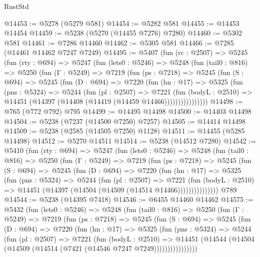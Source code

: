 \begin{lexlean}{RustStd}
\begin{coremodule}
@14453 := @5278 (@5279 @581)
@14454 := @5282 @581
@14455 := @14453 @14454
@14459 := @5238 (@5270 (@14455 @7276) @7280)
@14460 := @5302 @581
@14461 := @7286 @14460
@14462 := @5305 @581
@14466 := @7285 (@14461 @14462 @7247 @7249)
@14495 := @5407
    (fun (rc : @2507) =>
    @5245
      (fun (rty : @694) =>
      @5247
        (fun (lets0 : @5246) =>
        @5248
          (fun (tail0 : @816) =>
          @5250
            (fun (Γ : @5249) =>
            @7219
              (fun (ps : @7218) =>
              @5245
                (fun (S : @694) =>
                @5245
                  (fun (D : @694) =>
                  @7220
                    (fun (hn : @17) =>
                    @5325
                      (fun (pns : @5324) =>
                      @5244
                        (fun (pl : @2507) =>
                        @7221
                          (fun (bodyL : @2510) =>
                          @14451 (@14397 (@14408 (@14419 (@14459 @14466))))))))))))))))
@14498 := @765 (@772 @792) @795
@14499 := @14495 @14498
@14500 := @14403 @14498
@14504 := @5238 (@7237 (@14500 @7250) @7257)
@14505 := @14414 @14498
@14509 := @5238 (@2585 (@14505 @7250) @1128)
@14511 := @14455 (@5285 @14498)
@14512 := @5270 @14511
@14514 := @5238 (@14512 @7280)
@14542 := @5410
    (fun (rty : @694) =>
    @5247
      (fun (lets0 : @5246) =>
      @5248
        (fun (tail0 : @816) =>
        @5250
          (fun (Γ : @5249) =>
          @7219
            (fun (ps : @7218) =>
            @5245
              (fun (S : @694) =>
              @5245
                (fun (D : @694) =>
                @7220
                  (fun (hn : @17) =>
                  @5325
                    (fun (pns : @5324) =>
                    @5244
                      (fun (pl : @2507) =>
                      @7221
                        (fun (bodyL : @2510) =>
                        @14451 (@14397 (@14504 (@14509 (@14514 @14466)))))))))))))))
    @789
@14544 := @5238 (@14395 @7418)
@14546 := @6455 @14460 @14462
@14575 := @5432
    (fun (lets0 : @5246) =>
    @5248
      (fun (tail0 : @816) =>
      @5250
        (fun (Γ : @5249) =>
        @7219
          (fun (ps : @7218) =>
          @5245
            (fun (S : @694) =>
            @5245
              (fun (D : @694) =>
              @7220
                (fun (hn : @17) =>
                @5325
                  (fun (pns : @5324) =>
                  @5244
                    (fun (pl : @2507) =>
                    @7221
                      (fun (bodyL : @2510) =>
                      @14451
                        (@14544 (@14504 (@14509 (@14514 (@7421 (@14546 @7247 @7249))))))))))))))))

\end{coremodule}
\end{lexlean}
